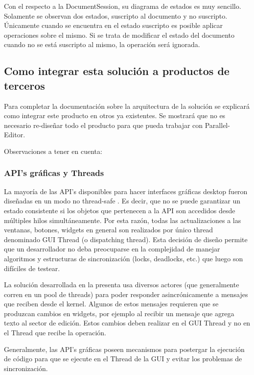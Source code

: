 \documentclass[12pt,a4paper]{article}
\begin{document}
Con el respecto a la DocumentSession, su diagrama de estados es muy sencillo. Solamente se observan dos estados, suscripto al
documento y no suscripto. Únicamente cuando se encuentra en el estado suscripto es posible aplicar operaciones sobre el mismo.
Si se trata de modificar el estado del documento cuando no se está suscripto al mismo, la operación será ignorada.

\subsection{Como integrar esta solución a productos de terceros}
Para completar la documentación sobre la arquitectura de la solución se explicará como integrar este producto en otros ya
existentes. Se mostrará que no es necesario re-diseñar todo el producto para que pueda trabajar con Parallel-Editor.

Observaciones a tener en cuenta:

\subsubsection{API’s gráficas y Threads}

La mayoría de las API’s disponibles para hacer interfaces gráficas desktop fueron diseñadas en un 
modo no thread-safe \cite{threads-swing,threads-swt}. Es decir, que no se puede garantizar un estado 
consistente si los objetos que pertenecen a la API son accedidos desde múltiples hilos simultáneamente. 
Por esta razón, todas las actualizaciones a las ventanas, botones, widgets
en general son realizados por único thread denominado GUI Thread (o dispatching thread). Esta decisión de diseño permite que
un desarrollador no deba preocuparse en la complejidad de manejar algoritmos y estructuras de sincronización
(locks, deadlocks, etc.) que luego son difíciles de testear.

La solución desarrollada en la presenta usa diversos actores (que generalmente corren en un pool de threads) para poder 
responder asincrónicamente a mensajes que reciben desde el kernel. Algunos de estos mensajes requieren que se produzcan
cambios en widgets, por ejemplo al recibir un mensaje que agrega texto al sector de edición. Estos cambios deben realizar en
el GUI Thread y no en el Thread que recibe la operación.

Generalmente, las API’s gráficas poseen mecanismos para postergar la ejecución de código para que se ejecute en el Thread de
la GUI \cite{swing-invoke-later,swt-async} y evitar los problemas de sincronización.
\end{document}
